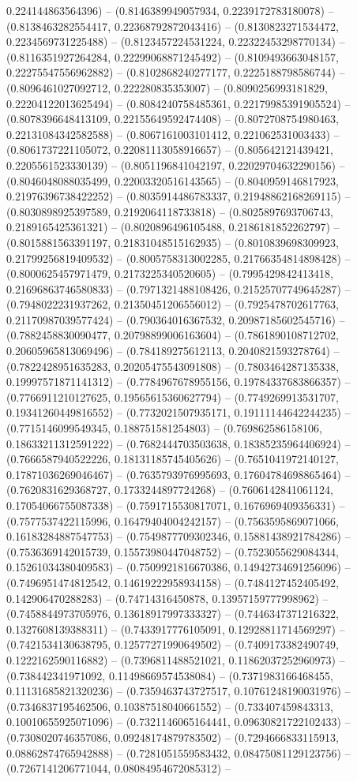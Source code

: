 0.224144863564396) -- (0.8146389949057934, 0.2239172783180078) -- (0.8138463282554417, 0.22368792872043416) -- (0.8130823271534472, 0.2234569731225488) -- (0.8123457224531224, 0.22322453298770134) -- (0.8116351927264284, 0.22299068871245492) -- (0.8109493663048157, 0.22275547556962882) -- (0.8102868240277177, 0.2225188798586744) -- (0.8096461027092712, 0.222280835353007) -- (0.8090256993181829, 0.22204122013625494) -- (0.8084240758485361, 0.22179985391905524) -- (0.8078396648413109, 0.22155649592474408) -- (0.8072708754980463, 0.22131084342582588) -- (0.8067161003101412, 0.221062531003433) -- (0.8061737221105072, 0.22081113058916657) -- (0.805642121439421, 0.2205561523330139) -- (0.8051196841042197, 0.22029704632290156) -- (0.8046048088035499, 0.22003320516143565) -- (0.8040959146817923, 0.21976396738422252) -- (0.8035914486783337, 0.21948862168269115) -- (0.8030898925397589, 0.2192064118733818) -- (0.8025897693706743, 0.2189165425361321) -- (0.8020896496105488, 0.2186181852262797) -- (0.8015881563391197, 0.21831048515162935) -- (0.8010839698309923, 0.21799256819409532) -- (0.8005758313002285, 0.21766354814898428) -- (0.8000625457971479, 0.2173225340520605) -- (0.7995429842413418, 0.21696863746580833) -- (0.7971321488108426, 0.21525707749645287) -- (0.7948022231937262, 0.21350451206556012) -- (0.7925478702617763, 0.21170987039577424) -- (0.790364016367532, 0.20987185602545716) -- (0.7882458830090477, 0.20798899006163604) -- (0.7861890108712702, 0.20605965813069496) -- (0.784189275612113, 0.2040821593278764) -- (0.7822428951635283, 0.20205475543091808) -- (0.7803464287135338, 0.19997571871141312) -- (0.7784967678955156, 0.19784337683866357) -- (0.7766911210127625, 0.19565615360627794) -- (0.7749269913531707, 0.19341260449816552) -- (0.7732021507935171, 0.19111144642244235) -- (0.7715146099549345, 0.188751581254803) -- (0.769862586158106, 0.18633211312591222) -- (0.7682444703503638, 0.18385235964406924) -- (0.7666587940522226, 0.18131185745405626) -- (0.7651041972140127, 0.17871036269046467) -- (0.7635793976995693, 0.17604784698865464) -- (0.7620831629368727, 0.1733244897724268) -- (0.7606142841061124, 0.17054066755087338) -- (0.7591715530817071, 0.1676969409356331) -- (0.7577537422115996, 0.16479404004242157) -- (0.7563595869071066, 0.16183284887547753) -- (0.7549877709302346, 0.15881438921784286) -- (0.7536369142015739, 0.15573980447048752) -- (0.7523055629084344, 0.15261034380409583) -- (0.7509921816670386, 0.14942734691256096) -- (0.7496951474812542, 0.14619222958934158) -- (0.7484127452405492, 0.142906470288283) -- (0.74714316450878, 0.13957159777998962) -- (0.7458844973705976, 0.13618917997333327) -- (0.7446347371216322, 0.1327608139388311) -- (0.7433917776105091, 0.12928811714569297) -- (0.7421534130638795, 0.12577271990649502) -- (0.7409173382490749, 0.1222162590116882) -- (0.7396811488521021, 0.11862037252960973) -- (0.738442341971092, 0.11498669574538084) -- (0.7371983166468455, 0.11131685821320236) -- (0.7359463743727517, 0.10761248190031976) -- (0.7346837195462506, 0.10387518040661552) -- (0.733407459843313, 0.10010655925071096) -- (0.7321146065164441, 0.09630821722102433) -- (0.7308020746357086, 0.09248174879783502) -- (0.7294666833115913, 0.08862874765942888) -- (0.7281051559583432, 0.08475081129123756) -- (0.7267141206771044, 0.08084954672085312) -- 
